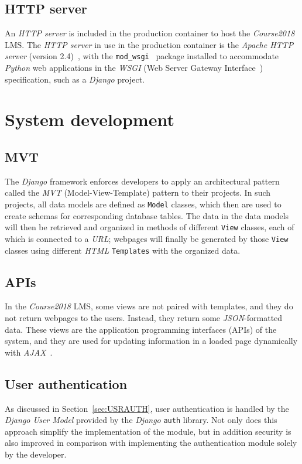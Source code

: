 \subsection{HTTP server}
An \emph{HTTP server} is included in the production container to host the
\emph{Course2018} LMS.
The \emph{HTTP server} in use in the production container is the
\emph{Apache HTTP server} (version 2.4)~\cite{apache}, with the
\texttt{mod\_wsgi}~\cite{wsgi} package installed to accommodate
\emph{Python} web applications in the \emph{WSGI}
(Web Server Gateway Interface~\cite{wsgi}) specification, such as a
\emph{Django} project.

\section{System development}

\subsection{MVT}
\label{sec:MVT}
The \emph{Django} framework enforces developers to apply an architectural
pattern called the \emph{MVT} (Model-View-Template) pattern to their projects.
In such projects,
all data models are defined as \texttt{Model} classes, which
then are used to create schemas for corresponding database tables.
The data in the data models will then be retrieved and organized in 
methods of different \texttt{View} classes, each of which 
is connected to a \emph{URL};
webpages will finally be generated by those \texttt{View} classes
using different \emph{HTML} \texttt{Templates} with the organized data.

\subsection{APIs}
In the \emph{Course2018} LMS, some views are not paired with templates, and
they do not return webpages to the users.
Instead, they return some
\emph{JSON}-formatted data.
These views are the application programming interfaces (APIs) of the system,
and they are used for updating information in
a loaded page dynamically with \emph{AJAX}~\cite{AJAX}. 



\subsection{User authentication}
As discussed in Section~\ref{sec:USRAUTH}, user authentication is handled by the
\emph{Django User Model} provided by the \emph{Django} \texttt{auth} library.
Not only does this approach simplify the implementation of the module,
but in addition security is also improved in comparison with implementing the authentication
module solely by the developer.

